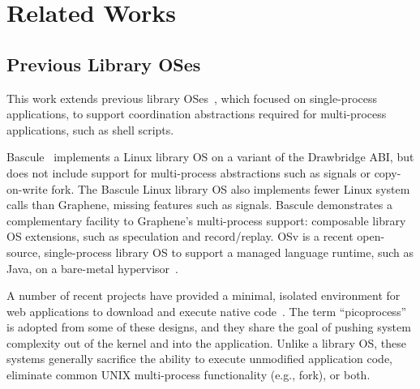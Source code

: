 \chapter{Related Works}
\label{chap:related}

\section{Previous Library OSes}

\begin{comment}
Recent library OSes, including Graphene,
search for a better
division of labor between the host kernel and guests.
Paravirtualized VMs attempt to move away from modeling specific hardware designs in software
toward a more virtualization-friendly hardware model~\citep{barham03xen,whitaker02denali, eiraku09outsourcing}.
Library OSes can be viewed as extreme paravirtualization---attempting
to find the most ideal interface between guest and host. %
\end{comment}


This work extends previous library OSes~\citep{porter11drawbridge,xax,unikernels,baumann13bascule,osv},
which focused on single-process applications,
to support coordination abstractions required 
for multi-process applications, such as shell scripts.


Bascule~\citep{baumann13bascule} implements a Linux library OS on a variant of the Drawbridge ABI,
but does not include support for multi-process abstractions such as signals or copy-on-write fork.
The Bascule Linux library OS also implements fewer Linux system calls than Graphene, missing
features such as signals.
Bascule demonstrates a complementary facility to Graphene's multi-process support: composable library OS extensions, 
such as speculation and record/replay.
OSv is a recent open-source, %
single-process 
library OS to support a managed language runtime, such as Java, on a bare-metal hypervisor~\citep{osv}.


A number of recent projects have provided a minimal, isolated environment
for web applications to download and execute native code~\citep{nacl,xax,howell13refactoring,gazelle,atlantis}.
The term ``picoprocess'' is adopted from some of these designs, and they share 
the goal of pushing system complexity out of the kernel and into the application.
Unlike a library OS, these systems
generally sacrifice the ability to execute unmodified application code, 
eliminate common UNIX multi-process functionality (e.g., fork), or both.


